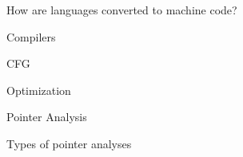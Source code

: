 How are languages converted to machine code?

Compilers

CFG

Optimization

Pointer Analysis

Types of pointer analyses
